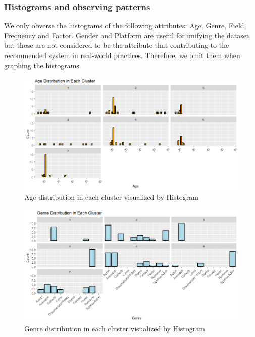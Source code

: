     \subsubsection{Histograms and observing patterns}
        We only obverse the histograms of the following attributes: Age, Genre, Field, Frequency and Factor. Gender and Platform are useful for unifying the dataset, but those are not considered to be the attribute that contributing to the recommended system in real-world practices. Therefore, we omit them when graphing the histograms.
        \begin{figure}[H]
            \centering
            \includegraphics[scale=0.6]{graphics/gower/histogram/age distrib.png}
            \caption{Age distribution in each cluster visualized by Histogram}
        \end{figure}
        \begin{figure}[H]
            \centering
            \includegraphics[scale=0.6]{graphics/gower/histogram/genre distrib.png}
            \caption{Genre distribution in each cluster visualized by Histogram}
        \end{figure}
